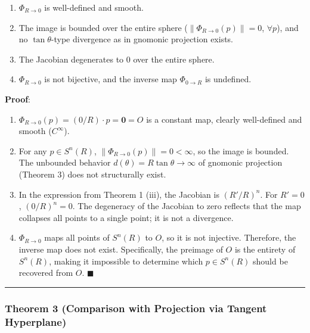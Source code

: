 \documentclass[
  a4paper]{article}
\providecommand{\tightlist}{%
  \setlength{\itemsep}{0pt}\setlength{\parskip}{0pt}}
\begin{document}
\begin{enumerate}
\def\labelenumi{(\roman{enumi})}
\tightlist
\item
  \(\Phi_{R \to 0}\) is well-defined and smooth.\\
\item
  The image is bounded over the entire sphere
  (\(\|\Phi_{R \to 0}(p)\| = 0\), \(\forall p\)), and no
  \(\tan\theta\)-type divergence as in gnomonic projection exists.\\
\item
  The Jacobian degenerates to \(0\) over the entire sphere.\\
\item
  \(\Phi_{R \to 0}\) is not bijective, and the inverse map
  \(\Phi_{0 \to R}\) is undefined.
\end{enumerate}

\textbf{Proof}:

\begin{enumerate}
\def\labelenumi{(\roman{enumi})}
\item
  \(\Phi_{R \to 0}(p) = (0/R) \cdot p = \mathbf{0} = O\) is a constant
  map, clearly well-defined and smooth (\(C^\infty\)).
\item
  For any \(p \in S^n(R)\), \(\|\Phi_{R \to 0}(p)\| = 0 < \infty\), so
  the image is bounded. The unbounded behavior
  \(d(\theta) = R\tan\theta \to \infty\) of gnomonic projection (Theorem
  3) does not structurally exist.
\item
  In the expression from Theorem 1 (iii), the Jacobian is \((R'/R)^n\).
  For \(R' = 0\), \((0/R)^n = 0\). The degeneracy of the Jacobian to
  zero reflects that the map collapses all points to a single point; it
  is not a divergence.
\item
  \(\Phi_{R \to 0}\) maps all points of \(S^n(R)\) to \(O\), so it is
  not injective. Therefore, the inverse map does not exist.
  Specifically, the preimage of \(O\) is the entirety of \(S^n(R)\),
  making it impossible to determine which \(p \in S^n(R)\) should be
  recovered from \(O\). \(\blacksquare\)
\end{enumerate}

\begin{center}\rule{0.5\linewidth}{0.5pt}\end{center}

\subsubsection{Theorem 3 (Comparison with Projection via Tangent
Hyperplane)}\label{theorem-3-comparison-with-projection-via-tangent-hyperplane}
\end{document}
